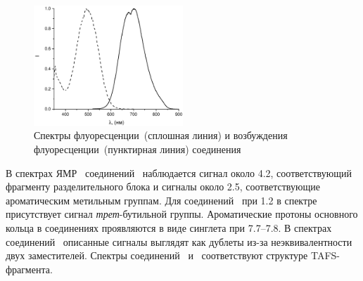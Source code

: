 \begin{figure}[h!]
    \centering
    \includegraphics[width = 0.5\textwidth]{sections/results/img/Graph3 - Copy.pdf}
    \caption{Спектры флуоресценции~(сплошная линия) и возбуждения флуоресценции~(пунктирная линия) соединения~}
\end{figure} 

В спектрах ЯМР~ соединений~ наблюдается сигнал около \SI{4.2}{\ppm}, соответствующий  фрагменту разделительного блока и сигналы около \SI{2.5}{\ppm}, соответствующие ароматическим метильным группам.
Для соединений~ при \SI{1.2}{\ppm} в спектре присутствует сигнал \emph{трет}-бутильной группы. Ароматические протоны основного  кольца в соединениях  проявляются в виде синглета при 7.7--\SI{7.8}{\ppm}.
В спектрах соединений~ описанные сигналы выглядят как дублеты из-за неэквивалентности двух заместителей.
Спектры  соединений~ и~ соответствуют структуре TAFS-фрагмента.

